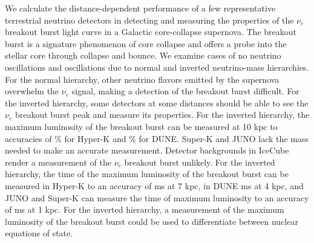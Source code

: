 We calculate the distance-dependent performance of a few representative terrestrial 
neutrino detectors in detecting and measuring the properties of the $\nu_e$
breakout 
burst light curve in a Galactic core-collapse supernova. The breakout 
burst is a signature phenomenon of core collapse and offers a probe
into 
the stellar core through collapse and bounce. We examine cases of 
no neutrino oscillations and oscillations due to normal and inverted 
neutrino-mass hierarchies. For the normal hierarchy, other neutrino 
flavors emitted by the supernova overwhelm the $\nu_e$ signal, making a 
detection of the breakout burst difficult. For the inverted hierarchy, 
some detectors at some distances should be able to see the $\nu_e$ breakout 
burst peak and measure its properties. For the inverted hierarchy, the 
maximum luminosity of the breakout burst can be measured at 10 kpc to 
accuracies of \% for Hyper-K and \% for DUNE. Super-K and JUNO lack 
the mass needed to make an accurate measurement. 
Detector backgrounds in IceCube render a measurement of the $\nu_e$
breakout burst unlikely. For the inverted
hierarchy, 
the time of the maximum luminosity of the breakout burst can be
measured 
in Hyper-K to an accuracy of  ms at 7 kpc, in DUNE  ms at 4 kpc, 
and JUNO and Super-K can measure the time of maximum luminosity to 
an accuracy of  ms at 1 kpc. For the inverted hierarchy, a 
measurement of the maximum luminosity of the breakout burst could 
be used to differentiate between nuclear equations of state. 
